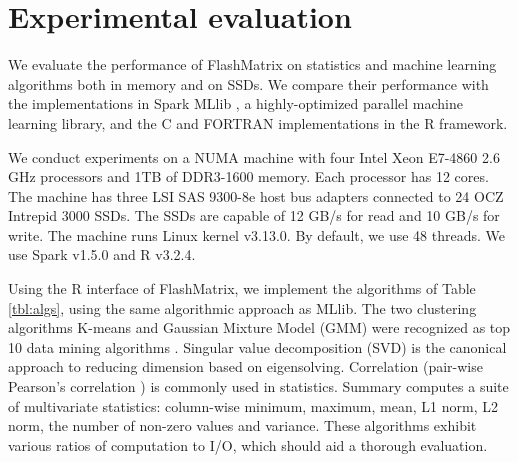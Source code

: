 \vspace{-10pt}
\section{Experimental evaluation}
\vspace{-5pt}
We evaluate the performance of FlashMatrix on statistics and machine learning
algorithms both in memory and on SSDs. We compare their performance with
the implementations in Spark MLlib \cite{mllib}, a highly-optimized parallel
machine learning library, and the C and FORTRAN implementations in the R framework.


We conduct experiments on a NUMA machine with
four Intel Xeon E7-4860 2.6 GHz processors and 1TB of 
DDR3-1600 memory. Each processor has 12 cores. The machine has three LSI SAS 9300-8e
host bus adapters connected to
24 OCZ Intrepid 3000 SSDs. The SSDs are capable of
12 GB/s for read and 10 GB/s for write. The machine runs
Linux kernel v3.13.0. By default, we use 48 threads. 
We use Spark v1.5.0 and R v3.2.4.


Using the R interface of FlashMatrix, we implement the algorithms of 
Table \ref{tbl:algs}, using the same algorithmic approach as MLlib.
The two clustering algorithms 
K-means \cite{kmeans} and Gaussian Mixture Model (GMM) \cite{gmm} 
were recognized as top 10 data mining algorithms \cite{top10}. 
Singular value decomposition (SVD) is the canonical approach to 
reducing dimension based on eigensolving.  Correlation 
(pair-wise Pearson's correlation \cite{cor}) is commonly used in statistics.
Summary computes a suite of multivariate statistics:
column-wise minimum, maximum, mean, L1 norm, L2 norm, the number of non-zero values and
		variance.
These algorithms exhibit various ratios of computation to I/O, which should aid
a thorough evaluation.



